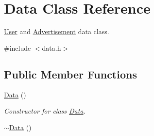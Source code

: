 \hypertarget{class_data}{}\section{Data Class Reference}
\label{class_data}


\hyperlink{class_user}{User} and \hyperlink{class_advertisement}{Advertisement} data class.  




{\ttfamily \#include $<$data.\+h$>$}

\subsection*{Public Member Functions}
\begin{DoxyCompactItemize}
\item 
\hypertarget{class_data_af11f741cb7f587e2e495452a8905a22a}{}\hyperlink{class_data_af11f741cb7f587e2e495452a8905a22a}{Data} ()\label{class_data_af11f741cb7f587e2e495452a8905a22a}

\begin{DoxyCompactList}\small\item\em Constructor for class \hyperlink{class_data}{Data}. \end{DoxyCompactList}\item 
\hypertarget{class_data_aab31956423290f0d62dcca47ab4d16dd}{}\hyperlink{class_data_aab31956423290f0d62dcca47ab4d16dd}{$\sim$\+Data} ()\label{class_data_aab31956423290f0d62dcca47ab4d16dd}


\end{DoxyCompactItemize}
